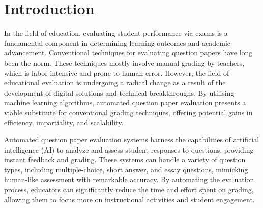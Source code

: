 
\chapter{Introduction}

\label{C1} %

\par 
In the field of education, evaluating student performance via exams is a fundamental component in determining learning outcomes and academic advancement. Conventional techniques for evaluating question papers have long been the norm. These techniques mostly involve manual grading by teachers, which is labor-intensive and prone to human error. However, the field of educational evaluation is undergoing a radical change as a result of the development of digital solutions and technical breakthroughs. By utilising machine learning algorithms, automated question paper evaluation presents a viable substitute for conventional grading techniques, offering potential gains in efficiency, impartiality, and scalability.
\par
Automated question paper evaluation systems harness the capabilities of artificial intelligence (AI) to analyze and assess student responses to questions, providing instant feedback and grading. These systems can handle a variety of question types, including multiple-choice, short answer, and essay questions, mimicking human-like assessment with remarkable accuracy. By automating the evaluation process, educators can significantly reduce the time and effort spent on grading, allowing them to focus more on instructional activities and student engagement.



